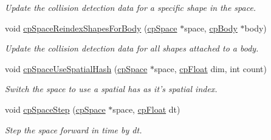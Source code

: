 \begin{DoxyCompactItemize}
\begin{DoxyCompactList}\small\item\em Update the collision detection data for a specific shape in the space. \end{DoxyCompactList}\item 
\hypertarget{group__cp_space_ga93a9cc05205923058aa6c2dcdaeb2d44}{void \hyperlink{group__cp_space_ga93a9cc05205923058aa6c2dcdaeb2d44}{cp\-Space\-Reindex\-Shapes\-For\-Body} (\hyperlink{structcp_space}{cp\-Space} $\ast$space, \hyperlink{structcp_body}{cp\-Body} $\ast$body)}\label{group__cp_space_ga93a9cc05205923058aa6c2dcdaeb2d44}

\begin{DoxyCompactList}\small\item\em Update the collision detection data for all shapes attached to a body. \end{DoxyCompactList}\item 
\hypertarget{group__cp_space_gae80141ab89b21e48a10850c3e2c81e91}{void \hyperlink{group__cp_space_gae80141ab89b21e48a10850c3e2c81e91}{cp\-Space\-Use\-Spatial\-Hash} (\hyperlink{structcp_space}{cp\-Space} $\ast$space, \hyperlink{group__basic_types_gac1ed65573e035bf892505768c852d8d3}{cp\-Float} dim, int count)}\label{group__cp_space_gae80141ab89b21e48a10850c3e2c81e91}

\begin{DoxyCompactList}\small\item\em Switch the space to use a spatial has as it's spatial index. \end{DoxyCompactList}\item 
\hypertarget{group__cp_space_gad8a6c8e7e99ae268af224aa199124706}{void \hyperlink{group__cp_space_gad8a6c8e7e99ae268af224aa199124706}{cp\-Space\-Step} (\hyperlink{structcp_space}{cp\-Space} $\ast$space, \hyperlink{group__basic_types_gac1ed65573e035bf892505768c852d8d3}{cp\-Float} dt)}\label{group__cp_space_gad8a6c8e7e99ae268af224aa199124706}

\begin{DoxyCompactList}\small\item\em Step the space forward in time by {\ttfamily dt}. \end{DoxyCompactList}\end{DoxyCompactItemize}
